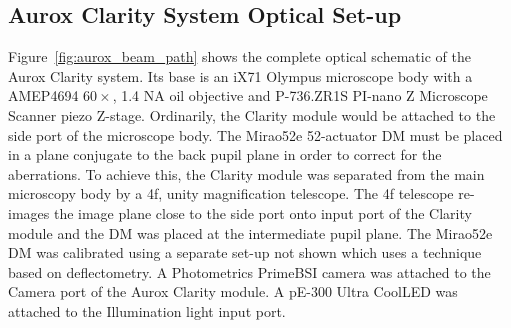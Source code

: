 \subsection{Aurox Clarity System Optical Set-up}
\label{subsec:aurox_optics}

Figure~\ref{fig:aurox_beam_path} shows the complete optical schematic of the Aurox Clarity system. Its base is an iX71 Olympus microscope body with a AMEP4694 $60\times$, 1.4 NA oil objective and P-736.ZR1S PI-nano Z Microscope Scanner piezo Z-stage. Ordinarily, the Clarity module would be attached to the side port of the microscope body. The Mirao52e 52-actuator DM must be placed in a plane conjugate to the back pupil plane in order to correct for the aberrations. To achieve this, the Clarity module was separated from the main microscopy body by a 4f, unity magnification telescope. The 4f telescope re-images the image plane close to the side port onto input port of the Clarity module and the DM was placed at the intermediate pupil plane. The Mirao52e DM was calibrated using a separate set-up not shown which uses a technique based on deflectometry\cite{trumper2016instantaneous,huang2017close}. A Photometrics PrimeBSI camera was attached to the Camera port of the Aurox Clarity module. A pE-300 Ultra CoolLED was attached to the Illumination light input port.

